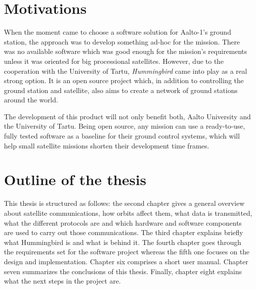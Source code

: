 \section{Motivations}

When the moment came to choose a software solution for Aalto-1's ground station, the approach was to develop something ad-hoc for the mission. There was no available software which was good enough for the mission's requirements unless it was oriented for big processional satellites. However, due to the cooperation with the University of Tartu, \emph{Hummingbird} came into play as a real strong option. It is an open source project which, in addition to controlling the ground station and satellite, also aims to create a network of ground stations around the world. 

The development of this product will not only benefit both, Aalto University and the University of Tartu. Being open source, any mission can use a ready-to-use, fully tested software as a baseline for their ground control systems, which will help small satellite missions shorten their development time frames. 

\pagebreak
\section{Outline of the thesis}
This thesis is structured as follows: the second chapter gives a general overview about satellite communications, how orbits affect them, what data is transmitted, what the different protocols are and which hardware and software components are used to carry out those communications. The third chapter explains briefly what Hummingbird is and what is behind it. The fourth chapter goes through the requirements set for the software project whereas the fifth one focuses on the design and implementation. Chapter six comprises a short user manual. Chapter seven summarizes the conclusions of this thesis. Finally, chapter eight explains what the next steps in the project are.

\newpage
